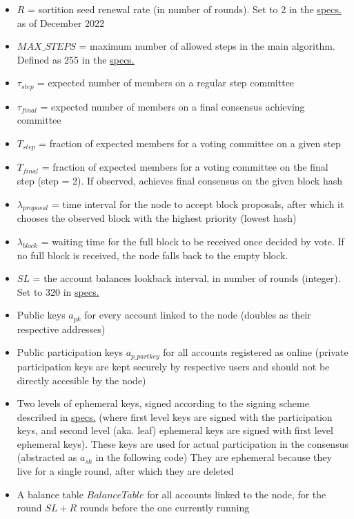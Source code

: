 \documentclass[10pt,a4paper]{article}
\begin{document}
\begin{itemize}
    \item $R$ = sortition seed renewal rate (in number of rounds). 
    Set to 2 in the \href{https://github.com/algorandfoundation/specs}{specs.}
    as of December 2022
    \item $MAX\_STEPS$ = maximum number of allowed steps in the main algorithm. Defined 
    as 255 in the \href{https://github.com/algorandfoundation/specs}{specs.}
    \item $\tau_{step}$ = expected number of members on a regular step committee
    \item $\tau_{final}$ = expected number of members on a final consensus achieving committee
    \item $T_{step}$ = fraction of expected members for a voting committee on a given step
    \item $T_{final}$ = fraction of expected members for a voting committee on the final step (step = 2). 
    If observed, achieves final consensus on the given block hash
    \item $\lambda_{proposal}$ = time interval for the node to accept block proposals, after
    which it chooses the observed block with the highest priority (lowest hash) 
    \item $\lambda_{block}$ = waiting time for the full block to be received once decided by vote.
    If no full block is received, the node falls back to the empty block.
    \item $SL$ = the account balances lookback interval, in number of rounds (integer). 
    Set to 320 in \href{https://github.com/algorandfoundation/specs}{specs.}
    \item Public keys $a_{pk}$ for every account linked to the node (doubles as their respective addresses)
    \item Public participation keys $a_{p\_partkey}$ for all accounts registered as online (private participation keys are kept
    securely by respective users and should not be directly accesible by the node)
    \item Two levels of ephemeral keys, signed according to the signing scheme described in \href{https://github.com/algorandfoundation/specs}{specs.} (where 
    first level keys are signed with the participation keys, and second level (aka. leaf) ephemeral keys are signed with 
    first level ephemeral keys). 
    These keys are used for actual participation in the consensus (abstracted as $a_{sk}$ in the following code)
    They are ephemeral because they live for a single round, after which they are deleted
    \item A balance table $BalanceTable$ for all accounts linked to the node, for the round $SL + R$ rounds before the one 
    currently running
\end{itemize}





\end{document}
